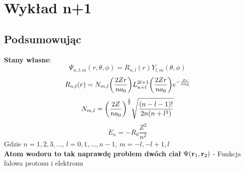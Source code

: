 \documentclass[12pt,a4paper]{report}
\renewcommand{\emph}{\textbf}
\newenvironment{lecture}[1]{\par\medskip
   \noindent\chapter{#1} \rmfamily}{\medskip}
\begin{document}
\begin{lecture}{Wykład n+1}
\section{Podsumowując}
\emph{Stany własne}:
\[
\Psi_{n, l ,m}(r, \theta, \phi) = R_{n,l}(r)Y_{l,m}(\theta, \phi)\]\[R_{n,l}(r) = N_{m,l}\qty(\frac{2 Z r}{n a_0}) L_{n+l}^{2l+1} \qty(\frac{2 Z r}{n a_0}) e^{-\frac{Zr}{n a_0}}\]\[N_{m,l} = \qty(\frac{2Z}{na_0})^{\frac32} \sqrt{\frac{(n-l-1)!}{2n(n+l^3)}}\]\[E_n = -R_0 \frac{Z^2}{n^2}
\]
Gdzie $n = 1, 2, 3, \dots$, $l = 0, 1, \dots, n-1$, $m = -l, -l+1, l$\\
\emph{Atom wodoru to tak naprawdę problem dwóch ciał}
\(
    \Psi(\vb{r}_1, \vb{r}_2)
\) - Funkcja falowa protonu i elektronu
\end{lecture}

\end{document}
